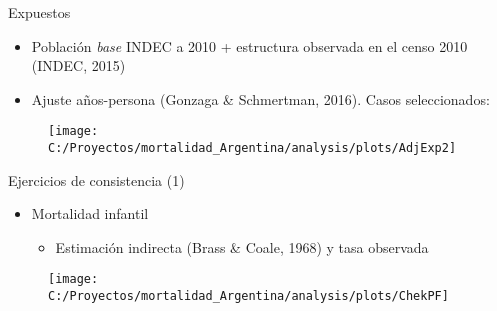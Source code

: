 \documentclass[10pt,ignorenonframetext,]{beamer}
\providecommand{\tightlist}{%
  \setlength{\itemsep}{0pt}\setlength{\parskip}{0pt}}
\begin{document}
\begin{frame}{Expuestos}

\begin{itemize}[<+->]
\tightlist
\item
  Población \emph{base} INDEC a 2010 + estructura observada en el censo
  2010 (INDEC, 2015)\\
\item
  Ajuste años-persona (Gonzaga \& Schmertman, 2016). Casos
  seleccionados:
\end{itemize}

\begin{figure}

{\centering \texttt{[image: C:/Proyectos/mortalidad\_Argentina/analysis/plots/AdjExp2]} 

}

\end{figure}

\end{frame}

\begin{frame}{Ejercicios de consistencia (1)}

\begin{itemize}[<+->]
\tightlist
\item
  Mortalidad infantil

  \begin{itemize}[<+->]
  \tightlist
  \item
    Estimación indirecta (Brass \& Coale, 1968) y tasa observada
  \end{itemize}
\end{itemize}

\pause

\begin{figure}

{\centering \texttt{[image: C:/Proyectos/mortalidad\_Argentina/analysis/plots/ChekPF]} 

}

\end{figure}

\end{frame}
\end{document}
